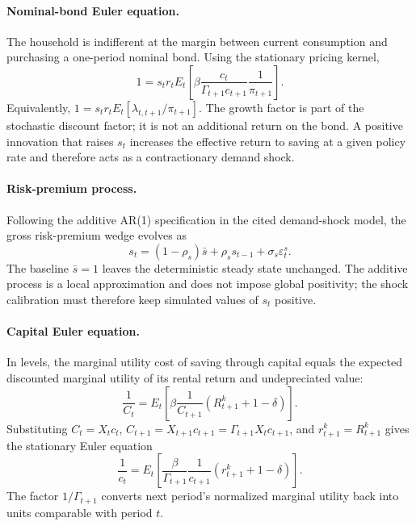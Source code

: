 \documentclass[12pt,final]{article}
\begin{document}
\paragraph{Nominal-bond Euler equation.}
The household is indifferent at the margin between current consumption and
purchasing a one-period nominal bond.  Using the stationary pricing kernel,
\begin{equation}
  1
  =s_tr_tE_t\left[
  \beta\frac{c_t}{\Gamma_{t+1}c_{t+1}}
  \frac{1}{\pi_{t+1}}
  \right].
  \label{eq:bond-euler}
\end{equation}
Equivalently, $1=s_tr_tE_t[\lambda_{t,t+1}/\pi_{t+1}]$.  The growth factor is
part of the stochastic discount factor; it is not an additional return on the
bond.  A positive innovation that raises $s_t$ increases the effective return
to saving at a given policy rate and therefore acts as a contractionary demand
shock.

\paragraph{Risk-premium process.}
Following the additive AR(1) specification in the cited demand-shock model, the
gross risk-premium wedge evolves as
\begin{equation}
  s_t=(1-\rho_s)\bar s+\rho_s s_{t-1}+\sigma_s\varepsilon_t^s.
  \label{eq:risk-premium-block}
\end{equation}
The baseline $\bar s=1$ leaves the deterministic steady state unchanged.  The
additive process is a local approximation and does not impose global positivity;
the shock calibration must therefore keep simulated values of $s_t$ positive.

\paragraph{Capital Euler equation.}
In levels, the marginal utility cost of saving through capital equals the
expected discounted marginal utility of its rental return and undepreciated
value:
\begin{equation}
  \frac{1}{C_t}
  =E_t\left[
    \beta\frac{1}{C_{t+1}}
    \left(R_{t+1}^k+1-\delta\right)
    \right].
  \label{eq:capital-euler-level}
\end{equation}
Substituting $C_t=X_tc_t$,
$C_{t+1}=X_{t+1}c_{t+1}=\Gamma_{t+1}X_tc_{t+1}$, and
$r_{t+1}^k=R_{t+1}^k$ gives the stationary Euler equation
\begin{equation}
  \frac{1}{c_t}
  =E_t\left[
    \frac{\beta}{\Gamma_{t+1}}\frac{1}{c_{t+1}}
    \left(r_{t+1}^k+1-\delta\right)
    \right].
  \label{eq:capital-euler}
\end{equation}
The factor $1/\Gamma_{t+1}$ converts next period's normalized marginal utility
back into units comparable with period $t$.
\end{document}
